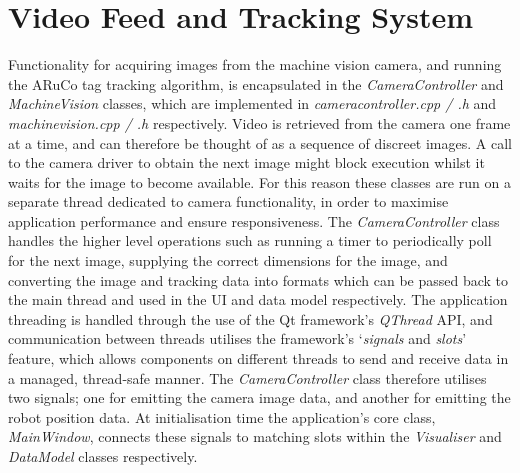 
\section{Video Feed and Tracking System} \label{VideoFeedAndTrackingSystem}
Functionality for acquiring images from the machine vision camera, and running the ARuCo tag tracking algorithm, is encapsulated in the \textit{CameraController} and \textit{MachineVision} classes, which are implemented in \textit{cameracontroller.cpp / .h} and \textit{machinevision.cpp / .h} respectively. Video is retrieved from the camera one frame at a time, and can therefore be thought of as a sequence of discreet images. A call to the camera driver to obtain the next image might block execution whilst it waits for the image to become available. For this reason these classes are run on a separate thread dedicated to camera functionality, in order to maximise application performance and ensure responsiveness. The \textit{CameraController} class handles the higher level operations such as running a timer to periodically poll for the next image, supplying the correct dimensions for the image, and converting the image and tracking data into formats which can be passed back to the main thread and used in the UI and data model respectively. The application threading is handled through the use of the Qt framework's \textit{QThread} API, and communication between threads utilises the framework's `\textit{signals} and \textit{slots}' feature, which allows components on different threads to send and receive data in a managed, thread-safe manner. The \textit{CameraController} class therefore utilises two signals; one for emitting the camera image data, and another for emitting the robot position data. At initialisation time the application's core class, \textit{MainWindow}, connects these signals to matching slots within the \textit{Visualiser} and \textit{DataModel} classes respectively.

